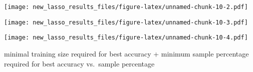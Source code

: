 \documentclass[
]{article}
\newenvironment{Shaded}{\begin{snugshade}}{\end{snugshade}}
\newcommand{\DataTypeTok}[1]{\textcolor[rgb]{0.13,0.29,0.53}{#1}}
\newcommand{\KeywordTok}[1]{\textcolor[rgb]{0.13,0.29,0.53}{\textbf{#1}}}
\newcommand{\NormalTok}[1]{#1}
\newcommand{\OperatorTok}[1]{\textcolor[rgb]{0.81,0.36,0.00}{\textbf{#1}}}
\newcommand{\StringTok}[1]{\textcolor[rgb]{0.31,0.60,0.02}{#1}}
\begin{document}
\texttt{[image: new\_lasso\_results\_files/figure-latex/unnamed-chunk-10-2.pdf]}

\begin{Shaded}
\end{Shaded}

\texttt{[image: new\_lasso\_results\_files/figure-latex/unnamed-chunk-10-3.pdf]}

\begin{Shaded}
\end{Shaded}

\texttt{[image: new\_lasso\_results\_files/figure-latex/unnamed-chunk-10-4.pdf]}

minimal training size required for best accuracy + minimum sample
percentage required for best accuracy vs.~sample percentage
\end{document}
